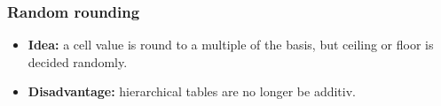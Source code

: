\begin{frame}\frametitle{Random rounding}
	\begin{itemize}
		\item {\bf Idea:} a cell value is round to a multiple of the basis, but ceiling or floor is decided randomly.\pause
		\item	{\bf Disadvantage:} hierarchical tables are no longer be additiv.
	\end{itemize}
\end{frame}


